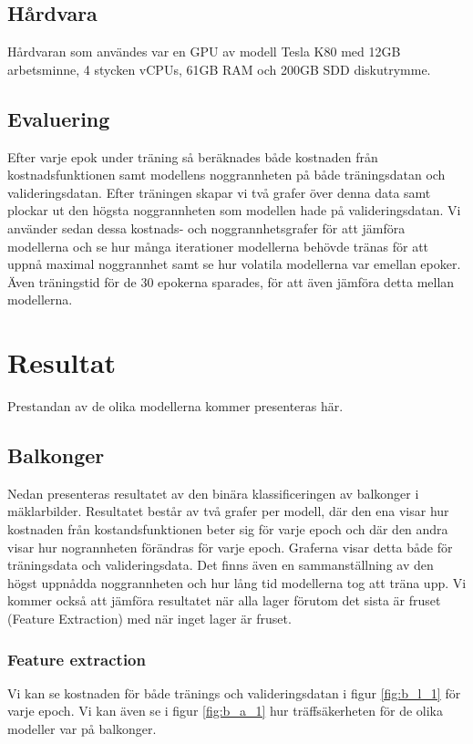 \documentclass[]{kththesis}
\begin{document}
\section{Hårdvara}
Hårdvaran som användes var en GPU av modell Tesla K80 med 12GB arbetsminne, 4 stycken vCPUs, 61GB RAM och 200GB SDD diskutrymme.

\section{Evaluering}
Efter varje epok under träning så beräknades både kostnaden från kostnadsfunktionen samt modellens noggrannheten på både träningsdatan och valideringsdatan. Efter träningen skapar vi två grafer över denna data samt plockar ut den högsta noggrannheten som modellen hade på valideringsdatan. Vi använder sedan dessa kostnads- och noggrannhetsgrafer för att jämföra modellerna och se hur många iterationer modellerna behövde tränas för att uppnå maximal noggrannhet samt se hur volatila modellerna var emellan epoker. Även träningstid för de 30 epokerna sparades, för att även jämföra detta mellan modellerna.

\chapter{Resultat}
Prestandan av de olika modellerna kommer presenteras här.


\section{Balkonger}
Nedan presenteras resultatet av den binära klassificeringen av balkonger i mäklarbilder. 
Resultatet består av två grafer per modell, där den ena visar hur kostnaden från kostandsfunktionen beter sig för varje epoch och där den andra visar hur nogrannheten förändras för varje epoch.
Graferna visar detta både för träningsdata och valideringsdata.
Det finns även en sammanställning av den högst uppnådda noggrannheten och hur lång tid modellerna tog att träna upp. 
Vi kommer också att jämföra resultatet när alla lager förutom det sista är fruset (Feature Extraction) med när inget lager är fruset.


\subsection{Feature extraction}
Vi kan se kostnaden för både tränings och valideringsdatan i figur \ref{fig:b_l_1} för varje epoch. Vi kan även se i figur \ref{fig:b_a_1} hur träffsäkerheten för de olika modeller var på balkonger.
\end{document}
